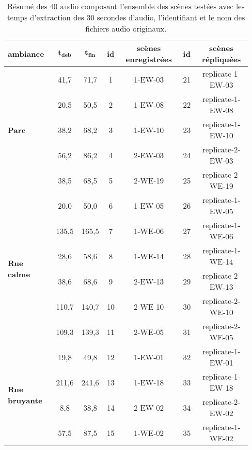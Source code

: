 \begin{table}[ht]
\caption{Résumé des 40 audio composant l'ensemble des scènes testées avec les temps d'extraction des 30 secondes d'audio, l'identifiant et le nom des fichiers audio originaux.}
\centering
\begin{tabular}{|p{2cm}|c|c||c|c||c|c|}
\toprule
\textbf{ambiance}                          & $\mathbf{t_{deb}}$          & $\mathbf{t_{fin}}$          & \textbf{id}   & \textbf{scènes enregistrées}         & \textbf{id}   & \textbf{scènes répliquées} \\
\midrule
\multirow{5}{2cm}{\textbf{Parc}}             & 41,7 & 71,7 & 1  & 1-EW-03 & 21 & replicate-1-EW-03         \\
                                  & 20,5 & 50,5 & 2  & 1-EW-08 & 22 & replicate-1-EW-08         \\
                                  & 38,2 & 68,2 & 3  & 1-EW-10 & 23 & replicate-1-EW-10         \\
                                  & 56,2 & 86,2 & 4  & 2-EW-03 & 24 & replicate-2-EW-03         \\
                                  & 38,5 & 68,5 & 5  & 2-WE-19 & 25 & replicate-2-WE-19         \\
\hline
\multirow{6}{2cm}{\textbf{Rue calme}}        & 20,0 & 50,0 & 6  & 1-EW-05 & 26 & replicate-1-EW-05     \\
                                  & 135,5 & 165,5 & 7  & 1-WE-06 & 27 & replicate-1-WE-06     \\
                                  & 28,6 & 58,6 & 8  & 1-WE-14 & 28 & replicate-1-WE-14     \\
                                  & 38,6 & 68,6 & 9  & 2-EW-13 & 29 & replicate-2-EW-13     \\
                                  & 110,7 & 140,7 & 10 & 2-WE-10 & 30 & replicate-2-WE-10     \\
                                  & 109,3 & 139,3 & 11 & 2-WE-05 & 31 & replicate-2-WE-05     \\
\hline
\multirow{4}{2cm}{\textbf{Rue bruyante}}       & 19,8 & 49,8 & 12 & 1-EW-01 & 32 & replicate-1-EW-01     \\
                                  & 211,6 & 241,6 & 13 & 1-EW-18 & 33 & replicate-1-EW-18     \\
                                  & 8,8 & 38,8 & 14 & 2-EW-02 & 34 & replicate-2-EW-02     \\
                                  & 57,5 & 87,5 & 15 & 1-WE-02 & 35 & replicate-1-WE-02     \\

\end{tabular}
\end{table}
